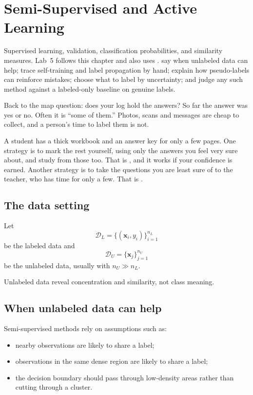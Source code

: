 \chapter{Semi-Supervised and Active Learning}
\label{ch:semi-supervised}

\chapterguide%
  {Supervised learning, validation, classification probabilities, and similarity measures. Lab~5 follows this chapter and also uses .}
  {say when unlabeled data can help; trace self-training and label propagation by hand; explain how pseudo-labels can reinforce mistakes; choose what to label by uncertainty; and judge any such method against a labeled-only baseline on genuine labels.}

Back to the map question: does your log hold the answers? So far the answer was yes or no. Often it is ``some of them.'' Photos, scans and messages are cheap to collect, and a person's time to label them is not.

\begin{analogy}
A student has a thick workbook and an answer key for only a few pages. One strategy is to mark the rest yourself, using only the answers you feel very sure about, and study from those too. That is , and it works if your confidence is earned. Another strategy is to take the questions you are least sure of to the teacher, who has time for only a few. That is .
\end{analogy}

\section{The data setting}

Let
\[
  \mathcal{D}_L=\{(\bm{x}_i,y_i)\}_{i=1}^{n_L}
\]
be the labeled data and
\[
  \mathcal{D}_U=\{\bm{x}_j\}_{j=1}^{n_U}
\]
be the unlabeled data, usually with $n_U\gg n_L$.

Unlabeled data reveal concentration and similarity, not class meaning.

\section{When unlabeled data can help}

Semi-supervised methods rely on assumptions such as:

\begin{itemize}
  \item nearby observations are likely to share a label;
  \item observations in the same dense region are likely to share a label;
  \item the decision boundary should pass through low-density areas rather than cutting through a cluster.
\end{itemize}

